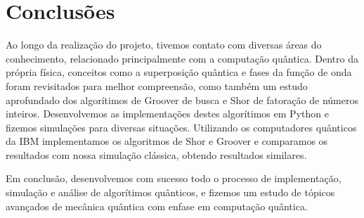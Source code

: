 \documentclass[12pt,a4paper]{article}
\begin{document}
\section{Conclusões}
Ao longo da realização do projeto, tivemos contato com diversas áreas do conhecimento, relacionado principalmente com a computação quântica. Dentro da própria física, conceitos como a superposição quântica e fases da função de onda foram revisitados para melhor compreensão, como também um estudo aprofundado dos algorítimos de Groover de busca e Shor de fatoração de números inteiros. Desenvolvemos as implementações destes algorítimos em Python e fizemos simulações para diversas situações. Utilizando os computadores quânticos da IBM implementamos os algoritmos de Shor e Groover e comparamos os resultados com nossa simulação clássica, obtendo resultados similares.

Em conclusão, desenvolvemos com sucesso todo o processo de implementação, simulação e análise de algorítimos quânticos, e fizemos um estudo de tópicos avançados de mecânica quântica com enfase em computação quântica.


\newpage





\singlespacing %
\setlength{\bibsep}{0.0pt}

\printbibliography

\end{document}
